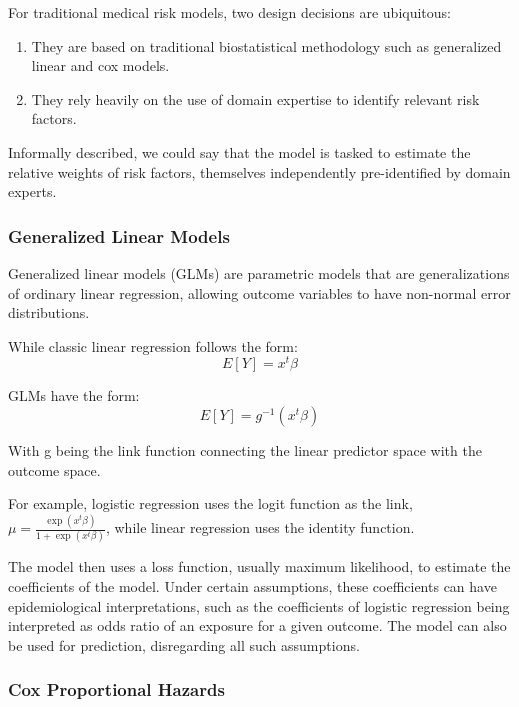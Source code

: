\documentclass[a4paper,12pt]{article}
\begin{document}
			For traditional medical risk models, two design decisions are ubiquitous\cite{Weng2017}:
			\begin{enumerate}
				\item They are based on traditional biostatistical methodology such as generalized linear and cox models.
				\item They rely heavily on the use of domain expertise to identify relevant risk factors.
			\end{enumerate}
		
			Informally described, we could say that the model is tasked to estimate the relative weights of risk factors, themselves independently pre-identified by domain experts.
		
			\subsubsection{Generalized Linear Models}
			
			Generalized linear models (GLMs) are parametric models that are generalizations of ordinary linear regression, allowing outcome variables to have non-normal error distributions\cite{Nelder1972}.
			
			While classic linear regression follows the form:
			\begin{equation*}
			E[Y] = x^t \beta
			\end{equation*}
			
			GLMs have the form:
			\begin{equation*}
			E[Y] = g^{-1} (x^t \beta)
			\end{equation*}
			
			With g being the link function connecting the linear predictor space with the outcome space.
			
			For example, logistic regression uses the logit function as the link, $ \mu = \frac{\exp (x^t \beta)}{1 + \exp (x^t \beta)} $, while linear regression uses the identity function.
			
			The model then uses a loss function, usually maximum likelihood, to estimate the coefficients of the model. Under certain assumptions, these coefficients can have epidemiological interpretations, such as the coefficients of logistic regression being interpreted as odds ratio of an exposure for a given outcome. The model can also be used for prediction, disregarding all such assumptions.
			
			\subsubsection{Cox Proportional Hazards}
			
\end{document}
